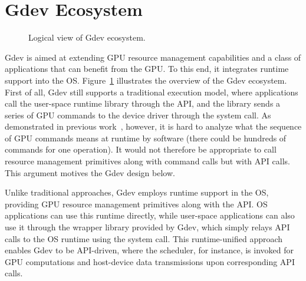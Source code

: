 \section{Gdev Ecosystem}
\label{sec:ecosystem}

\begin{figure}[t]
 \begin{center}
  \caption{Logical view of Gdev ecosystem.}
  \label{fig:gdev}
 \end{center}
 \vspace{-1em}
\end{figure}

Gdev is aimed at extending GPU resource management capabilities and a
class of applications that can benefit from the GPU.
To this end, it integrates runtime support into the OS.
Figure~\ref{fig:gdev} illustrates the overview of the Gdev ecosystem.
First of all, Gdev still supports a traditional execution model, where
applications call the user-space runtime library through the API, and
the library sends a series of GPU commands to the device driver through
the system call.
As demonstrated in previous work~\cite{Kato_ATC11}, however, it is hard
to analyze what the sequence of GPU commands means at runtime by
software (there could be hundreds of commands for one operation).
It would not therefore be appropriate to call resource management
primitives along with command calls but with API calls.
This argument motives the Gdev design below.

Unlike traditional approaches, Gdev employs runtime support in
the OS, providing GPU resource management primitives along with the API.
OS applications can use this runtime directly, while user-space
applications can also use it through the wrapper library provided by
Gdev, which simply relays API calls to the OS runtime using the system
call.
This runtime-unified approach enables Gdev to be API-driven, where the
scheduler, for instance, is invoked for GPU computations and host-device
data transmissions upon corresponding API calls.

